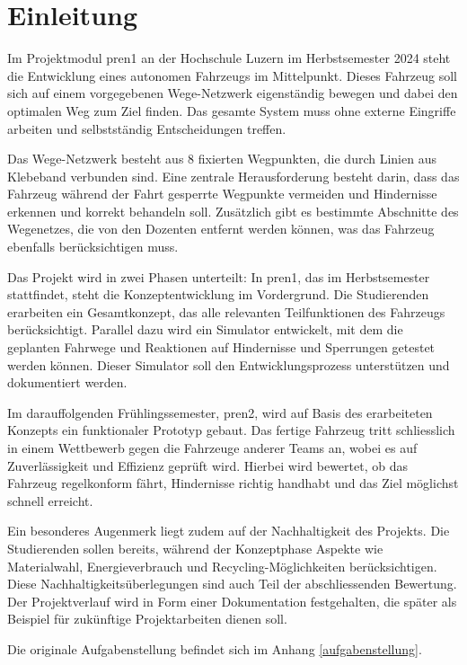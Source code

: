 \documentclass[../main.tex]{subfiles}
\begin{document}
\newpage
\section{Einleitung}
Im Projektmodul \acrfull{pren1} an der Hochschule Luzern im Herbstsemester 2024 steht die Entwicklung eines autonomen Fahrzeugs im Mittelpunkt. Dieses Fahrzeug soll sich auf einem vorgegebenen Wege-Netzwerk eigenständig bewegen und dabei den optimalen Weg zum Ziel finden. Das gesamte System muss ohne externe Eingriffe arbeiten und selbstständig Entscheidungen treffen. 

Das Wege-Netzwerk besteht aus 8 fixierten Wegpunkten, die durch Linien aus Klebeband verbunden sind. Eine zentrale Herausforderung besteht darin, dass das Fahrzeug während der Fahrt gesperrte Wegpunkte vermeiden und Hindernisse erkennen und korrekt behandeln soll. Zusätzlich gibt es bestimmte Abschnitte des Wegenetzes, die von den Dozenten entfernt werden können, was das Fahrzeug ebenfalls berücksichtigen muss. 

Das Projekt wird in zwei Phasen unterteilt: In \acrshort{pren1}, das im Herbstsemester stattfindet, steht die Konzeptentwicklung im Vordergrund. Die Studierenden erarbeiten ein Gesamtkonzept, das alle relevanten Teilfunktionen des Fahrzeugs berücksichtigt. Parallel dazu wird ein Simulator entwickelt, mit dem die geplanten Fahrwege und Reaktionen auf Hindernisse und Sperrungen getestet werden können. Dieser Simulator soll den Entwicklungsprozess unterstützen und dokumentiert werden. 

Im darauffolgenden Frühlingssemester, \acrshort{pren2}, wird auf Basis des erarbeiteten Konzepts ein funktionaler Prototyp gebaut. Das fertige Fahrzeug tritt schliesslich in einem Wettbewerb gegen die Fahrzeuge anderer Teams an, wobei es auf Zuverlässigkeit und Effizienz geprüft wird. Hierbei wird bewertet, ob das Fahrzeug regelkonform fährt, Hindernisse richtig handhabt und das Ziel möglichst schnell erreicht. 

Ein besonderes Augenmerk liegt zudem auf der Nachhaltigkeit des Projekts. Die Studierenden sollen bereits, während der Konzeptphase Aspekte wie Materialwahl, Energieverbrauch und Recycling-Möglichkeiten berücksichtigen. Diese Nachhaltigkeitsüberlegungen sind auch Teil der abschliessenden Bewertung. Der Projektverlauf wird in Form einer Dokumentation festgehalten, die später als Beispiel für zukünftige Projektarbeiten dienen soll.

Die originale Aufgabenstellung befindet sich im Anhang \ref{aufgabenstellung}.
\end{document}
